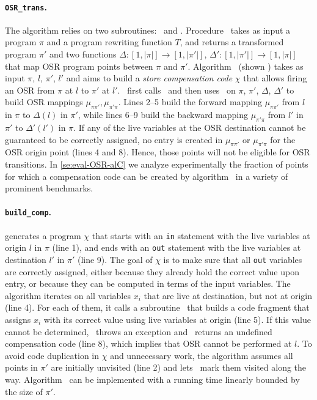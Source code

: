 \paragraph*{\texttt{OSR\_trans}.} The algorithm relies on two subroutines: \apply\ and \buildcomp. Procedure \apply\ takes as input a program $\pi$ and a program rewriting function $T$, and returns a transformed program $\pi'$ and two functions $\Delta:[1,|\pi|]\rightarrow [1,|\pi'|]$, $\Delta':[1,|\pi'|]\rightarrow [1,|\pi|]$ that map OSR program points between $\pi$ and $\pi'$. 
Algorithm \buildcomp\ (shown ) takes as input $\pi$, $l$, $\pi'$, $l'$ and aims to build a {\em store compensation code} $\chi$ that allows firing an OSR from $\pi$ at $l$ to $\pi'$ at $l'$. \osrtrans\ first calls \apply\ and then uses \buildcomp\ on $\pi$, $\pi'$, $\Delta$, $\Delta'$ to build OSR mappings $\mu_{\pi\pi'},\mu_{\pi'\pi}$. Lines 2--5 build the forward mapping $\mu_{\pi\pi'}$ from $l$ in $\pi$ to $\Delta(l)$ in $\pi'$, while lines 6--9 build the backward mapping $\mu_{\pi'\pi}$ from $l'$ in $\pi'$ to $\Delta'(l')$ in $\pi$. If any of the live variables at the OSR destination cannot be guaranteed to be correctly assigned, no entry is created in $\mu_{\pi\pi'}$ or $\mu_{\pi'\pi}$ for the OSR origin point (lines 4 and 8). Hence, those points will not be eligible for OSR transitions. In \mysection\ref{se:eval-OSR-alC} we analyze experimentally the fraction of points for which a compensation code can be created by algorithm \buildcomp\ in a variety of prominent benchmarks.

\paragraph*{\texttt{build\_comp}.}  generates a program $\chi$ that starts with an {\tt in} statement with the live variables at origin $l$ in $\pi$ (line 1), and ends with an {\tt out} statement with the live variables at destination $l'$ in $\pi'$ (line 9). The goal of $\chi$ is to make sure that all {\tt out} variables are correctly assigned, either because they already hold the correct value upon entry, or because they can be computed in terms of the input variables. The algorithm iterates on all variables $x_i$ that are live at destination, but not at origin (line 4). For each of them, it calls a subroutine \reconstruct\ that builds a code fragment that assigns $x_i$ with its correct value using live variables at origin (line 5). If this value cannot be determined, \reconstruct\ throws an exception and \buildcomp\ returns an undefined compensation code (line 8), which implies that OSR cannot be performed at $l$. To avoid code duplication in $\chi$ and unnecessary work, the algorithm assumes all points in $\pi'$ are initially unvisited (line 2) and lets \reconstruct\ mark them visited along the way. Algorithm \buildcomp\ can be implemented with a running time linearly bounded by the size of $\pi'$.

